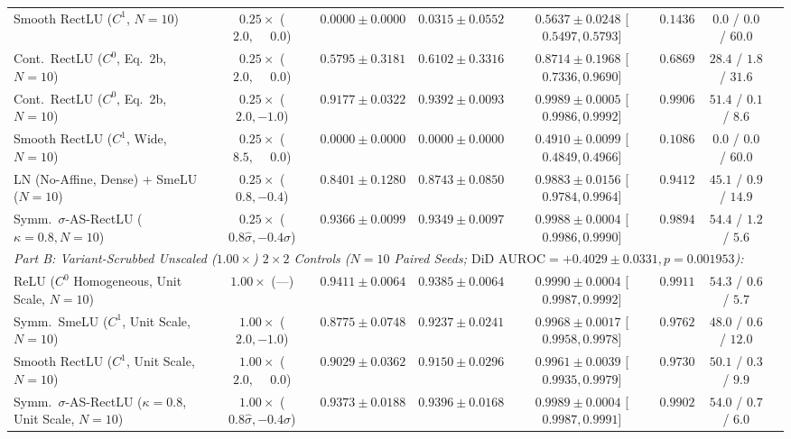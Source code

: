 \documentclass[11pt, a4paper]{article}
\begin{document}
\begin{table}[!htbp]
{\begin{tabular}{l c c c c c c c}
\rowcolor{alertred}
Smooth RectLU ($C^{1}$, $N=10$) & $0.25\times$ ($2.0, \phantom{-}0.0$) & $0.0000 \pm 0.0000$ & $0.0315 \pm 0.0552$ & $0.5637 \pm 0.0248$ [$0.5497, 0.5793$] & $0.1436$ & $0.0$ / $0.0$ / $60.0$ \\
Cont.\ RectLU ($C^{0}$, Eq.\ 2b, $N=10$) & $0.25\times$ ($2.0, \phantom{-}0.0$) & $0.5795 \pm 0.3181$ & $0.6102 \pm 0.3316$ & $0.8714 \pm 0.1968$ [$0.7336, 0.9690$] & $0.6869$ & $28.4$ / $1.8$ / $31.6$ \\
\rowcolor{goodgreen}
Cont.\ RectLU ($C^{0}$, Eq.\ 2b, $N=10$) & $0.25\times$ ($2.0, -1.0$) & $0.9177 \pm 0.0322$ & $0.9392 \pm 0.0093$ & \textbf{$0.9989 \pm 0.0005$} [$0.9986, 0.9992$] & \textbf{$0.9906$} & $51.4$ / $0.1$ / $8.6$ \\
\rowcolor{alertred}
Smooth RectLU ($C^{1}$, Wide, $N=10$) & $0.25\times$ ($8.5, \phantom{-}0.0$) & $0.0000 \pm 0.0000$ & $0.0000 \pm 0.0000$ & $0.4910 \pm 0.0099$ [$0.4849, 0.4966$] & $0.1086$ & $0.0$ / $0.0$ / $60.0$ \\
\rowcolor{goodgreen}
LN (No-Affine, Dense) + SmeLU ($N=10$) & $0.25\times$ ($0.8, -0.4$) & $0.8401 \pm 0.1280$ & $0.8743 \pm 0.0850$ & $0.9883 \pm 0.0156$ [$0.9784, 0.9964$] & $0.9412$ & $45.1$ / $0.9$ / $14.9$ \\
\rowcolor{goodgreen}
Symm.\ $\sigma$-AS-RectLU ($\kappa=0.8, N=10$) & $0.25\times$ ($0.8\hat{\sigma}, -0.4\hat{\sigma}$) & \textbf{$0.9366 \pm 0.0099$} & $0.9349 \pm 0.0097$ & $0.9988 \pm 0.0004$ [$0.9986, 0.9990$] & $0.9894$ & $54.4$ / $1.2$ / $5.6$ \\
\midrule
\multicolumn{7}{l}{\textit{Part B: Variant-Scrubbed Unscaled ($1.00\times$) $2 \times 2$ Controls ($N=10$ Paired Seeds; $\text{DiD AUROC} = +0.4029 \pm 0.0331, p = 0.001953$):}} \\
ReLU ($C^{0}$ Homogeneous, Unit Scale, $N=10$) & $1.00\times$ (---) & \textbf{$0.9411 \pm 0.0064$} & $0.9385 \pm 0.0064$ & \textbf{$0.9990 \pm 0.0004$} [$0.9987, 0.9992$] & \textbf{$0.9911$} & $54.3$ / $0.6$ / $5.7$ \\
Symm.\ SmeLU ($C^{1}$, Unit Scale, $N=10$) & $1.00\times$ ($2.0, -1.0$) & $0.8775 \pm 0.0748$ & $0.9237 \pm 0.0241$ & $0.9968 \pm 0.0017$ [$0.9958, 0.9978$] & $0.9762$ & $48.0$ / $0.6$ / $12.0$ \\
\rowcolor{goodgreen}
Smooth RectLU ($C^{1}$, Unit Scale, $N=10$) & $1.00\times$ ($2.0, \phantom{-}0.0$) & $0.9029 \pm 0.0362$ & $0.9150 \pm 0.0296$ & $0.9961 \pm 0.0039$ [$0.9935, 0.9979$] & $0.9730$ & $50.1$ / $0.3$ / $9.9$ \\
\rowcolor{goodgreen}
Symm.\ $\sigma$-AS-RectLU ($\kappa=0.8$, Unit Scale, $N=10$) & $1.00\times$ ($0.8\hat{\sigma}, -0.4\hat{\sigma}$) & $0.9373 \pm 0.0188$ & \textbf{$0.9396 \pm 0.0168$} & $0.9989 \pm 0.0004$ [$0.9987, 0.9991$] & $0.9902$ & $54.0$ / $0.7$ / $6.0$ \\

\end{tabular}}
\end{table}
\end{document}
